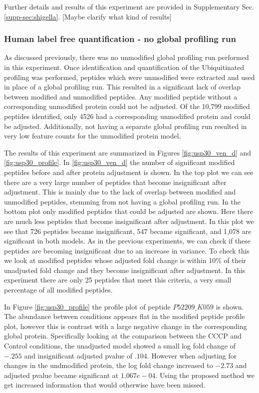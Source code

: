 \documentclass[mcp]{article}
\numberwithin{figure}{section} %
\numberwithin{table}{section}
\def\todo#1{{\color{red}[#1]}}
\begin{document}
Further details and results of this experiment are provided in Supplementary Sec. \ref{supp-sec:shigella}.  \todo{Maybe clarify what kind of results}

\subsubsection*{Human label free quantification - no global profiling run}

As discussed previously, there was no unmodified global profiling run performed in this experiment. Once identification and quantification of the Ubiquitinated profiling was performed, peptides which were unmodified were extracted and used in place of a global profiling run. This resulted in a significant lack of overlap between modified and unmodified peptides. Any modified peptide without a corresponding unmodified protein could not be adjusted. Of the 10,799 modified peptides identified, only 4526 had a corresponding unmodified protein and could be adjusted. Additionally, not having a separate global profiling run resulted in very low feature counts for the unmodified protein model.

The results of this experiment are summarized in Figures \ref{fig:usp30_ven_d} and \ref{fig:usp30_profile}. In \ref{fig:usp30_ven_d} the number of significant modified peptides before and after protein adjustment is shown. In the top plot we can see there are a very large number of peptides that become insignificant after adjustment. This is mainly due to the lack of overlap between modified and unmodified peptides, stemming from not having a global profiling run. In the bottom plot only modified peptides that could be adjusted are shown. Here there are much less peptides that become insignificant after adjustment. In this plot we see that 726 peptides became insignificant, 547 became significant, and 1,078 are significant in both models. As in the previous experiments, we can check if these peptides are becoming insignificant due to an increase in variance. To check this we look at modified peptides whose adjusted fold change is within 10\% of their unadjusted fold change and they become insignificant after adjustment. In this experiment there are only 25 peptides that meet this criteria, a very small percentage of all modified peptides.

In Figure \ref{fig:usp30_profile} the profile plot of peptide $P52209\_K059$ is shown. The abundance between conditions appears flat in the modified peptide profile plot, however this is contrast with a large negative change in the corresponding global protein. Specifically looking at the comparison between the CCCP and Control conditions, the unadjusted model showed a small log fold change of $-.255$ and insignificant adjusted pvalue of $.104$. However when adjusting for changes in the undmodified protein, the log fold change increased to $-2.73$ and adjusted pvalue became significant at $1.067e-04$. Using the proposed method we get increased information that would otherwise have been missed.
\end{document}
